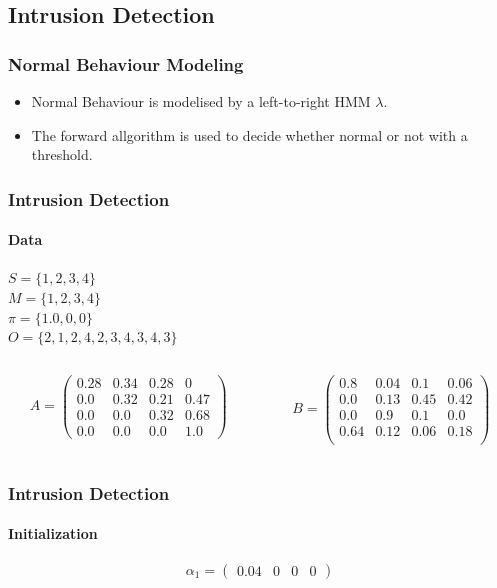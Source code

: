 \documentclass{beamer}
\begin{document}
\subsection{Intrusion Detection}
\begin{frame}
  \frametitle{Normal Behaviour Modeling}
  \begin{itemize}
  \item Normal Behaviour is modelised by a left-to-right HMM $\lambda$.
  \item The forward allgorithm is used to decide whether normal or not
    with a threshold.
  \end{itemize}
\end{frame}
\begin{frame}
  \frametitle{Intrusion Detection}
  \framesubtitle{Data}
  $S = \{1,2,3,4\}$\\
  $M = \{1,2,3,4\}$\\
  $\pi = \{1.0,0,0\}$\\
  $O = \{2,1,2,4,2,3,4,3,4,3\}$
  \begin{columns}[T]
    \begin{column}{.45\textwidth}
      $$
      A = \begin{pmatrix}
        0.28 & 0.34 & 0.28 & 0\\
        0.0 & 0.32 & 0.21 & 0.47\\
        0.0 & 0.0 & 0.32 & 0.68\\
        0.0 & 0.0 & 0.0 & 1.0
      \end{pmatrix}
      $$
    \end{column}
    \begin{column}{.45\textwidth}
      $$
      B = \begin{pmatrix}
        0.8 & 0.04 & 0.1 & 0.06\\
        0.0 & 0.13 & 0.45 & 0.42\\
        0.0 & 0.9 & 0.1 & 0.0\\
        0.64 & 0.12 & 0.06 & 0.18\\
      \end{pmatrix}
      $$
    \end{column}
  \end{columns}
\end{frame}
\begin{frame}
  \frametitle{Intrusion Detection}
  \framesubtitle{Initialization}
  $$
  \alpha_1 = \begin{pmatrix} 0.04 & 0 & 0 & 0\end{pmatrix}
  $$
\end{frame}
\end{document}
